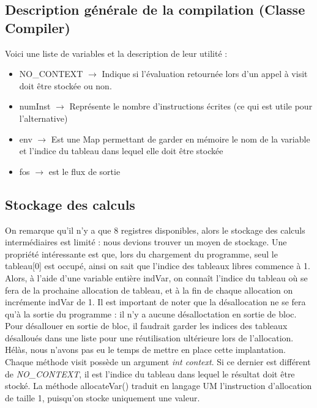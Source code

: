 \documentclass[a4paper,12pt]{report}
\begin{document}
\subsection{Description générale de la compilation (Classe Compiler)}
Voici une liste de variables et la description de leur utilité :
\begin{itemize}
 \item NO\_CONTEXT $\rightarrow$ Indique si l'évaluation retournée lors d'un appel à visit doit être stockée ou non.
 \item numInst $\rightarrow$ Représente le nombre d'instructions écrites (ce qui est utile pour l'alternative)
 \item env $\rightarrow$ Est une Map permettant de garder en mémoire le nom de la variable et l'indice du tableau dans lequel elle doit être
 stockée
 \item fos $\rightarrow$ est le flux de sortie
\end{itemize}

\subsection{Stockage des calculs}
On remarque qu'il n'y a que 8 registres disponibles, alors le stockage des calculs intermédiaires est limité : nous
devions trouver un moyen de stockage. Une propriété intéressante est que, lors du chargement du programme, seul le tableau[0] est occupé, ainsi on sait que l'indice des tableaux libres commence à 1. Alors, à l'aide d'une variable entière indVar, on connaît l'indice du tableau où se fera de la prochaine allocation de tableau, et à la fin de chaque allocation on incrémente indVar de 1. Il est important de noter que la désallocation ne se fera qu'à la sortie du programme : il n'y a aucune désalloctation en sortie de bloc. \\
Pour désallouer en sortie de bloc, il faudrait garder les indices des tableaux désalloués dans
une liste pour une réutilisation ultérieure lors de l'allocation. Hélàs, nous n'avons pas eu le temps de mettre en place cette implantation.
Chaque méthode visit possède un argument \textit{int context}. Si ce dernier est différent de \textit{NO\_CONTEXT}, il est l'indice du tableau 
dans lequel le résultat doit être stocké.
La méthode allocateVar() traduit en langage UM l'instruction d'allocation de taille 1, puisqu'on stocke uniquement une valeur.
\end{document}
